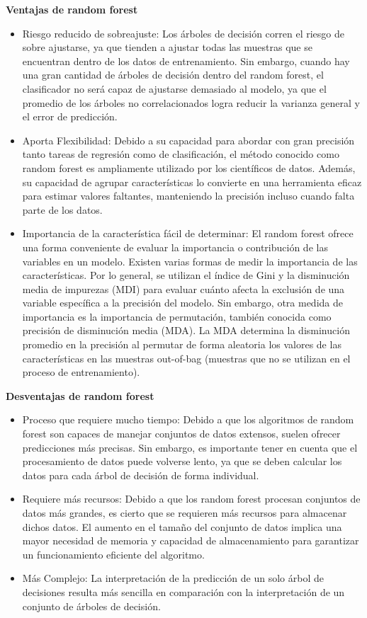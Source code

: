 \textbf{Ventajas de random forest}
\begin{itemize}
    \item Riesgo reducido de sobreajuste: Los árboles de decisión corren el riesgo de sobre ajustarse, ya que tienden a ajustar todas las muestras que se encuentran dentro de los datos de entrenamiento. Sin embargo, cuando hay una gran cantidad de árboles de decisión dentro del random forest, el clasificador no será capaz de ajustarse demasiado al modelo, ya que el promedio de los árboles no correlacionados logra reducir la varianza general y el error de predicción.
    \item Aporta Flexibilidad: Debido a su capacidad para abordar con gran precisión tanto tareas de regresión como de clasificación, el método conocido como random forest es ampliamente utilizado por los científicos de datos. Además, su capacidad de agrupar características lo convierte en una herramienta eficaz para estimar valores faltantes, manteniendo la precisión incluso cuando falta parte de los datos.
    \item Importancia de la característica fácil de determinar: El random forest ofrece una forma conveniente de evaluar la importancia o contribución de las variables en un modelo. Existen varias formas de medir la importancia de las características. Por lo general, se utilizan el índice de Gini y la disminución media de impurezas (MDI) para evaluar cuánto afecta la exclusión de una variable específica a la precisión del modelo.
    Sin embargo, otra medida de importancia es la importancia de permutación, también conocida como precisión de disminución media (MDA). La MDA determina la disminución promedio en la precisión al permutar de forma aleatoria los valores de las características en las muestras out-of-bag (muestras que no se utilizan en el proceso de entrenamiento).
\end{itemize}

\textbf{Desventajas de random forest}
\begin{itemize}
    \item Proceso que requiere mucho tiempo: Debido a que los algoritmos de random forest son capaces de manejar conjuntos de datos extensos, suelen ofrecer predicciones más precisas. Sin embargo, es importante tener en cuenta que el procesamiento de datos puede volverse lento, ya que se deben calcular los datos para cada árbol de decisión de forma individual.  
    \item Requiere más recursos: Debido a que los random forest procesan conjuntos de datos más grandes, es cierto que se requieren más recursos para almacenar dichos datos. El aumento en el tamaño del conjunto de datos implica una mayor necesidad de memoria y capacidad de almacenamiento para garantizar un funcionamiento eficiente del algoritmo.    
    \item Más Complejo: La interpretación de la predicción de un solo árbol de decisiones resulta más sencilla en comparación con la interpretación de un conjunto de árboles de decisión.
\end{itemize}